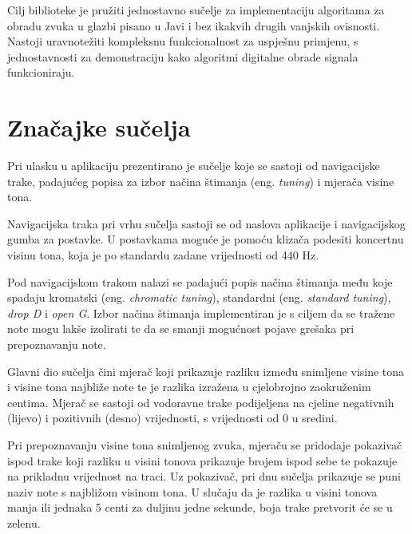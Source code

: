 \documentclass[times, utf8, zavrsni, numeric]{fer}
\begin{document}
Cilj biblioteke je pružiti jednostavno sučelje za implementaciju algoritama za obradu zvuka u glazbi pisano u Javi i bez ikakvih drugih vanjskih ovisnosti. Nastoji uravnotežiti kompleksnu funkcionalnost za uspješnu primjenu, s jednostavnosti za demonstraciju kako algoritmi digitalne obrade signala funkcioniraju.\cite{six_cornelis_lerman}

\section{Značajke sučelja}
Pri ulasku u aplikaciju prezentirano je sučelje koje se sastoji od navigacijske trake, padajućeg popisa za izbor načina štimanja (eng. \textit{tuning}) i mjerača visine tona.

Navigacijska traka pri vrhu sučelja sastoji se od naslova aplikacije i navigacijskog gumba za postavke. U postavkama moguće je pomoću klizača podesiti koncertnu visinu tona, koja je po standardu zadane vrijednosti od 440 Hz.

Pod navigacijskom trakom nalazi se padajući popis načina štimanja među koje spadaju kromatski (eng. \textit{chromatic tuning}), standardni (eng. \textit{standard tuning}), \textit{drop D} i \textit{open G}. Izbor načina štimanja implementiran je s ciljem da se tražene note mogu lakše izolirati te da se smanji mogućnost pojave grešaka pri prepoznavanju note.

Glavni dio sučelja čini mjerač koji prikazuje razliku između snimljene visine tona i visine tona najbliže note te je razlika izražena u cjelobrojno zaokruženim centima. Mjerač se sastoji od vodoravne trake podijeljena na cjeline negativnih (lijevo) i pozitivnih (desno) vrijednosti, s vrijednosti od 0 u sredini.

Pri prepoznavanju visine tona snimljenog zvuka, mjeraču se pridodaje pokazivač ispod trake koji razliku u visini tonova prikazuje brojem ispod sebe te pokazuje na prikladnu vrijednost na traci. Uz pokazivač, pri dnu sučelja prikazuje se puni naziv note s najbližom visinom tona. U slučaju da je razlika u visini tonova manja ili jednaka 5 centi za duljinu jedne sekunde, boja trake pretvorit će se u zelenu.
\end{document}
